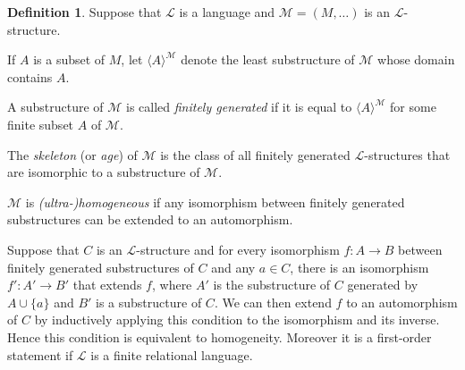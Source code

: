 \documentclass[10pt]{amsart}
\renewcommand{\L}{\mathcal{L}}
\newcommand{\MM}{\mathcal{M}}
\newcommand{\NN}{\mathcal{N}}
\renewcommand{\AA}{\mathcal{A}}
\newcommand{\BB}{\mathcal{B}}
\newcommand{\K}{\mathcal{K}}
\theoremstyle{definition}
\newtheorem{definition}[theorem]{Definition}
\theoremstyle{remark}
\newenvironment{enumerate-(a)}{\begin{enumerate}[label={\upshape (\alph*)}, leftmargin=2pc]}{\end{enumerate}}
\begin{document}
\begin{definition} 
Suppose that $\L$ is a language and $\MM=(M,\dots)$ is an $\L$-structure. 
\begin{enumerate-(a)} 
\item 
If $A$ is a subset of $M$, let $\langle A\rangle^{\MM}$ denote the least substructure of $\MM$ whose domain contains $A$. 
\item 
A substructure of $\MM$ is called \emph{finitely generated} if it is equal to $\langle A\rangle^{\MM}$ for some finite subset $A$ of $\MM$. 
\item 
The \emph{skeleton} (or \emph{age}) of 
$\MM$ is the class of all finitely generated $\L$-structures that are isomorphic to a substructure of $\MM$. 
\item 
$\MM$ is \emph{(ultra-)homogeneous} if any isomorphism between finitely generated substructures can be extended to an automorphism. 
\end{enumerate-(a)} 
\end{definition} 

Suppose that $C$ is an $\L$-structure and for every isomorphism $f\colon A\rightarrow B$ between finitely generated substructures of $C$ and any $a\in C$, there is an isomorphism $f'\colon A'\rightarrow B'$ that extends $f$, where $A'$ is the substructure of $C$ generated by $A\cup\{a\}$ and $B'$ is a substructure of $C$. We can then extend $f$  to an automorphism of $C$ by inductively applying this condition to the isomorphism and its inverse. Hence this condition is equivalent to homogeneity. Moreover it is a first-order statement if $\L$ is a finite relational language. 
\end{document}
